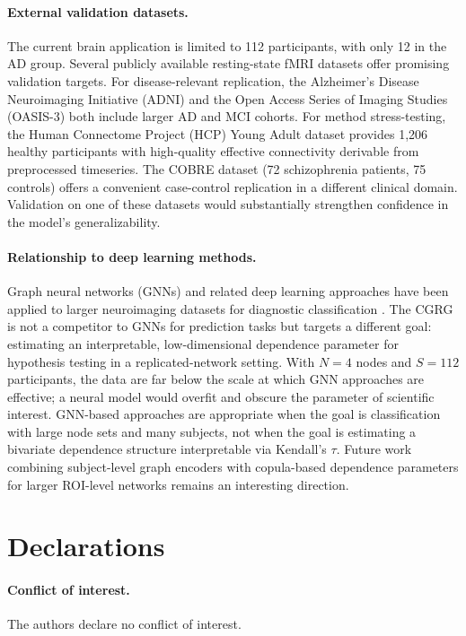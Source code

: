 \documentclass[12pt]{article}
\begin{document}
\paragraph{External validation datasets.}
The current brain application is limited to 112 participants, with only 12 in
the AD group.  Several publicly available resting-state fMRI datasets offer
promising validation targets.  For disease-relevant replication, the
Alzheimer's Disease Neuroimaging Initiative (ADNI) and the Open Access Series
of Imaging Studies (OASIS-3) both include larger AD and MCI cohorts.  For
method stress-testing, the Human Connectome Project (HCP) Young Adult dataset
provides 1,206 healthy participants with high-quality effective connectivity
derivable from preprocessed timeseries.  The COBRE dataset (72 schizophrenia
patients, 75 controls) offers a convenient case-control replication in a
different clinical domain.  Validation on one of these datasets would
substantially strengthen confidence in the model's generalizability.

\paragraph{Relationship to deep learning methods.}
Graph neural networks (GNNs) and related deep learning approaches have been
applied to larger neuroimaging datasets for diagnostic classification
\citep{huang2022}.  The CGRG is not a competitor to GNNs for prediction tasks
but targets a different goal: estimating an interpretable, low-dimensional
dependence parameter for hypothesis testing in a replicated-network setting.
With $N = 4$ nodes and $S = 112$ participants, the data are far below the
scale at which GNN approaches are effective; a neural model would overfit and
obscure the parameter of scientific interest.  GNN-based approaches are
appropriate when the goal is classification with large node sets and many
subjects, not when the goal is estimating a bivariate dependence structure
interpretable via Kendall's $\tau$.  Future work combining subject-level
graph encoders with copula-based dependence parameters for larger ROI-level
networks remains an interesting direction.

\section*{Declarations}

\paragraph{Conflict of interest.}
The authors declare no conflict of interest.
\end{document}
